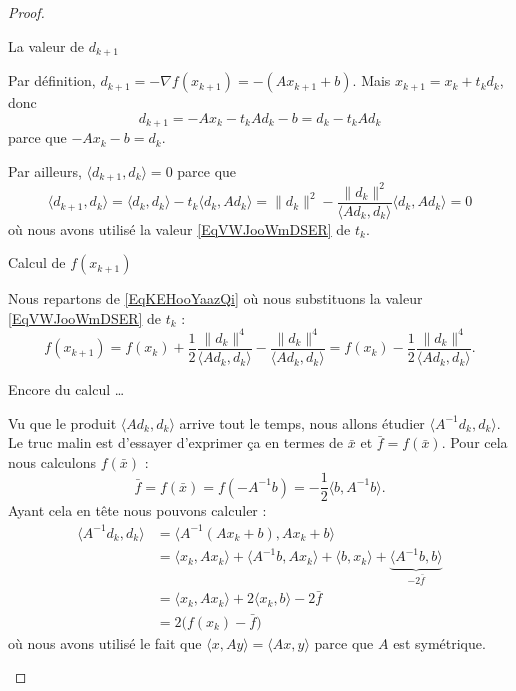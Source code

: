\begin{proof}
\begin{subproof}
        \item[La valeur de \( d_{k+1}\)]

            Par définition, \( d_{k+1}=-\nabla f(x_{k+1})=-(Ax_{k+1}+b)\). Mais \( x_{k+1}=x_k+t_kd_k\), donc
            \begin{equation}
                d_{k+1}=-Ax_k-t_kAd_k-b=d_k-t_kAd_k
            \end{equation}
            parce que \( -Ax_k-b=d_k\).
            
            Par ailleurs, \( \langle d_{k+1}, d_k\rangle =0\) parce que
            \begin{equation}
                \langle d_{k+1}, d_k\rangle =\langle d_k, d_k\rangle -t_k\langle d_k, Ad_k\rangle =\| d_k \|^2-\frac{ \| d_k \|^2 }{ \langle Ad_k, d_k\rangle  }\langle d_k, Ad_k\rangle =0
            \end{equation}
            où nous avons utilisé la valeur \eqref{EqVWJooWmDSER} de \( t_k\).
        
        \item[Calcul de \( f(x_{k+1})\)] 

            Nous repartons de \eqref{EqKEHooYaazQi} où nous substituons la valeur \eqref{EqVWJooWmDSER} de \( t_k\) :
            \begin{equation}
                f(x_{k+1})=f(x_k)+\frac{ 1 }{2}\frac{ \| d_k \|^4 }{ \langle Ad_k, d_k\rangle  }-\frac{ \| d_k \|^4 }{ \langle Ad_k, d_k\rangle  }=f(x_k)-\frac{ 1 }{2}\frac{ \| d_k \|^4 }{ \langle Ad_k, d_k\rangle  }.
            \end{equation}
            
        \item[Encore du calcul \ldots]

            Vu que le produit \( \langle Ad_k, d_k\rangle \) arrive tout le temps, nous allons étudier \( \langle A^{-1}d_k, d_k\rangle \). Le truc malin est d'essayer d'exprimer ça en termes de \( \bar x\) et \( \bar f=f(\bar x)\). Pour cela nous calculons \( f(\bar x)\) :
            \begin{equation}
                \bar f=f(\bar x)=f(-A^{-1} b)=-\frac{ 1 }{2}\langle b, A^{-1}b\rangle .
            \end{equation}
            Ayant cela en tête nous pouvons calculer :
            \begin{subequations}
                \begin{align}
                    \langle A^{-1}d_k, d_k\rangle &=\langle A^{-1}(Ax_k+b), Ax_k+b\rangle \\
                    &=\langle x_k, Ax_k\rangle +\langle A^{-1}b, Ax_k\rangle +\langle b, x_k\rangle+\underbrace{\langle A^{-1}b, b\rangle}_{-2\bar f} \\
                    &=\langle x_k, Ax_k\rangle +2\langle x_k, b\rangle  -2\bar f \label{subeqVIIooVzZlRc}\\
                    &=2\big( f(x_k)-\bar f \big)
                \end{align}
            \end{subequations}
            où nous avons utilisé le fait que \( \langle x, Ay\rangle =\langle Ax, y\rangle \) parce que \( A\) est symétrique.


\end{subproof}
\end{proof}
